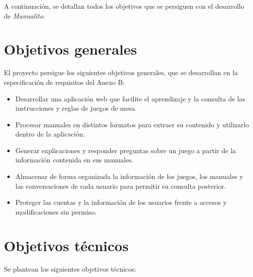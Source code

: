 
A continuación, se detallan todos los objetivos que se persiguen con
el desarrollo de \textit{Manualito}.

\section{Objetivos generales}
\label{objetivos:generales}

El proyecto persigue los siguientes objetivos generales, que se desarrollan
en la especificación de requisitos del Anexo B:

\begin{itemize}
    \item Desarrollar una aplicación web que facilite el
    aprendizaje y la consulta de las instrucciones y reglas de juegos de mesa.

    \item Procesar manuales en distintos formatos para extraer
    su contenido y utilizarlo dentro de la aplicación.

    \item Generar explicaciones y responder preguntas sobre
    un juego a partir de la información contenida en sus manuales.

    \item Almacenar de forma organizada la información de los
    juegos, los manuales y las conversaciones de cada usuario para permitir
    su consulta posterior.

    \item Proteger las cuentas y la información de los
    usuarios frente a accesos y modificaciones sin permiso.
\end{itemize}

\section{Objetivos técnicos}
\label{objetivos:especificos}

Se plantean los siguientes objetivos técnicos:


